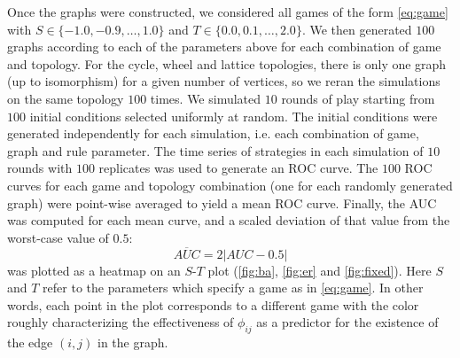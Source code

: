 \documentclass[letterpaper]{article}
\begin{document}
Once the graphs were constructed, we considered all games of the form \cref{eq:game} with $S \in \{-1.0, -0.9, \ldots, 1.0\}$ and $T \in \{0.0, 0.1, \ldots, 2.0\}$. We then generated $100$ graphs according to each of the parameters above for each combination of game and topology. For the cycle, wheel and lattice topologies, there is only one graph (up to isomorphism) for a given number of vertices, so we reran the simulations on the same topology $100$ times. We simulated $10$ rounds of play starting from $100$ initial conditions selected uniformly at random. The initial conditions were generated independently for each simulation, i.e. each combination of game, graph and rule parameter. The time series of strategies in each simulation of $10$ rounds with $100$ replicates was used to generate an ROC curve. The $100$ ROC curves for each game and topology combination (one for each randomly generated graph) were point-wise averaged to yield a mean ROC curve. Finally, the AUC was computed for each mean curve, and a scaled deviation of that value from the worst-case value of $0.5$:
\begin{equation}
    \label{eq:aucbar}
    \overline{AUC} = 2|AUC - 0.5|
\end{equation}
was plotted as a heatmap on an $S$-$T$ plot (\cref{fig:ba}, \cref{fig:er} and \cref{fig:fixed}). Here $S$ and $T$ refer to the parameters which specify a game as in \cref{eq:game}. In other words, each point in the plot corresponds to a different game with the color roughly characterizing the effectiveness of $\phi_{ij}$ as a predictor for the existence of the edge $(i,j)$ in the graph.
\end{document}
